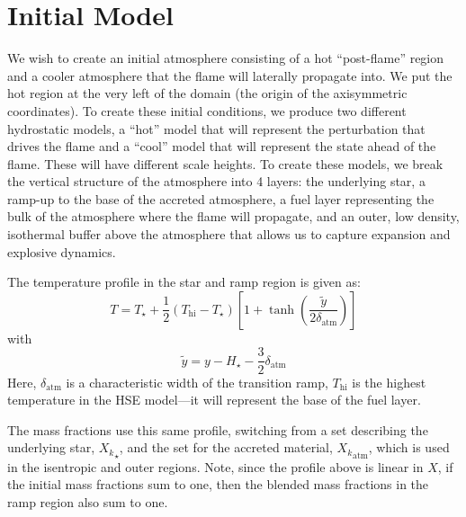 \documentclass[preprint,times,tighten]{aastex63}
\begin{document}
\section{Initial Model}\label{Sec:inital_model}


We wish to create an initial atmosphere consisting of a hot
``post-flame'' region and a cooler atmosphere that the flame will
laterally propagate into.  We put the hot region at the very left of
the domain (the origin of the axisymmetric coordinates).  To create
these initial conditions, we produce two different hydrostatic models,
a ``hot'' model that will represent the perturbation that drives the
flame and a ``cool'' model that will represent the state ahead of the
flame.  These will have different scale heights.  To create these
models, we break the vertical structure of the atmosphere into 4
layers: the underlying star, a ramp-up to the base of the
accreted atmosphere, a fuel layer representing the bulk of the
atmosphere where the flame will propagate, and an outer, low density,
isothermal buffer above the atmosphere that allows us
to capture expansion and explosive dynamics.  

The temperature profile in the star and ramp region is given as:
\begin{equation}
T = T_\star + \frac{1}{2} (T_\mathrm{hi} - T_\star) \left [ 1 + \tanh\left( \frac{\tilde{y}}{2 \delta_\mathrm{atm}} \right ) \right ]
\end{equation}
with
\begin{equation}
\tilde{y} = y - H_\star - \frac{3}{2} \delta_\mathrm{atm}
\end{equation}
Here, $\delta_\mathrm{atm}$ is a characteristic width of the transition
ramp, $T_\mathrm{hi}$ is the highest temperature in the HSE model---it
will represent the base of the fuel layer.

The mass fractions use this same profile, switching from a set
describing the underlying star, ${X_k}_\star$, and the set for the
accreted material, ${X_k}_\mathrm{atm}$, which is used in the
isentropic and outer regions.  Note, since the profile above is
linear in $X$, if the initial mass fractions sum to one, then the blended
mass fractions in the ramp region also sum to one.
\end{document}
